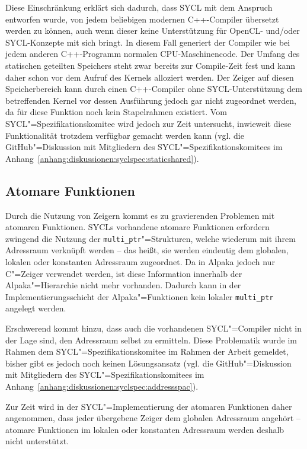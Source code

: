 Diese Einschränkung erklärt sich dadurch, dass SYCL mit dem Anspruch entworfen
wurde, von jedem beliebigen modernen C++-Compiler übersetzt werden zu können,
auch wenn dieser keine Unterstützung für OpenCL- und/oder SYCL-Konzepte mit sich
bringt. In diesem Fall generiert der Compiler wie bei jedem anderen C++-Programm
normalen CPU-Maschinencode. Der Umfang des statischen geteilten Speichers steht
zwar bereits zur Compile-Zeit fest und kann daher schon vor dem Aufruf des
Kernels alloziert werden. Der Zeiger auf diesen Speicherbereich kann durch einen
C++-Compiler ohne SYCL-Unterstützung dem betreffenden Kernel vor dessen
Ausführung jedoch gar nicht zugeordnet werden, da für diese Funktion noch kein
Stapelrahmen existiert. Vom SYCL"=Spezifikationskomitee wird jedoch zur Zeit
untersucht, inwieweit diese Funktionalität trotzdem verfügbar gemacht werden
kann (vgl. die GitHub"=Diskussion mit Mitgliedern des
SYCL"=Spezifikationskomitees im
Anhang~\ref{anhang:diskussionen:syclspec:staticshared}).

\subsection{Atomare Funktionen}\label{implementierung:probleme:atomics}

Durch die Nutzung von Zeigern kommt es zu gravierenden Problemen mit atomaren
Funktionen. SYCLs vorhandene atomare Funktionen erfordern zwingend die Nutzung
der \texttt{multi\_ptr}"=Strukturen, welche wiederum mit ihrem Adressraum
verknüpft werden -- das heißt, sie werden eindeutig dem globalen, lokalen oder
konstanten Adressraum zugeordnet. Da in Alpaka jedoch nur C"=Zeiger
verwendet werden, ist diese Information innerhalb der Alpaka"=Hierarchie nicht
mehr vorhanden. Dadurch kann in der Implementierungsschicht der
Alpaka"=Funktionen kein lokaler \texttt{multi\_ptr} angelegt werden.

Erschwerend kommt hinzu, dass auch die vorhandenen SYCL"=Compiler nicht in der
Lage sind, den Adressraum selbst zu ermitteln. Diese Problematik wurde im Rahmen
dem SYCL"=Spezifikationskomitee im Rahmen der Arbeit gemeldet, bisher gibt es
jedoch noch keinen Lösungsansatz (vgl. die GitHub"=Diskussion mit Mitgliedern
des SYCL"=Spezifikationskomitees im
Anhang~\ref{anhang:diskussionen:syclspec:addressspac}).

Zur Zeit wird in der SYCL"=Implementierung der atomaren Funktionen daher
angenommen, dass jeder übergebene Zeiger dem globalen Adressraum angehört --
atomare Funktionen im lokalen oder konstanten Adressraum werden deshalb nicht
unterstützt.

